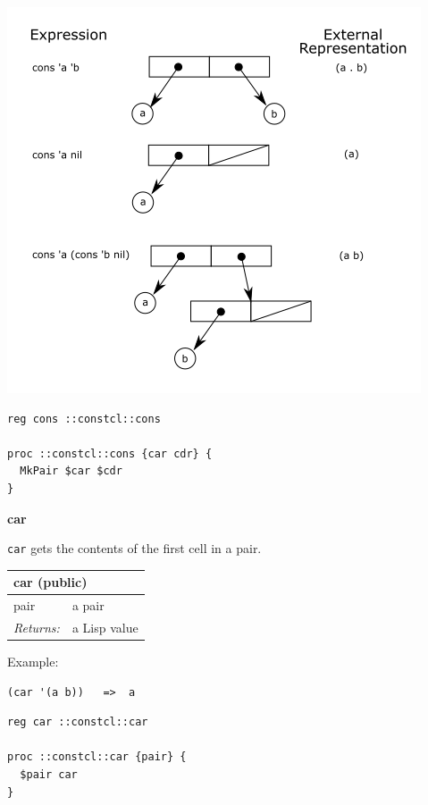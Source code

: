 \documentclass[twoside,9pt]{report}
\begin{document}
\includegraphics{images/consing.png}

\noindent\makebox[\linewidth]{\rule{\linewidth}{0.4pt}}
\begin{lstlisting}
reg cons ::constcl::cons
 
proc ::constcl::cons {car cdr} {
  MkPair $car $cdr
}
\end{lstlisting}
\noindent\makebox[\linewidth]{\rule{\linewidth}{0.4pt}}

\textbf{car}


\texttt{car} gets the contents of the first cell in a pair.

\begin{tabular}{ |l l| }
\hline
\multicolumn{2}{|l|}{car (public)} \\
\hline
pair & a pair \\
\textit{Returns:} & a Lisp value \\
\hline
\end{tabular}


Example:

\noindent\makebox[\linewidth]{\rule{\linewidth}{0.4pt}}
\begin{lstlisting}
(car '(a b))   =>  a
\end{lstlisting}
\noindent\makebox[\linewidth]{\rule{\linewidth}{0.4pt}}
\noindent\makebox[\linewidth]{\rule{\linewidth}{0.4pt}}
\begin{lstlisting}
reg car ::constcl::car
 
proc ::constcl::car {pair} {
  $pair car
}
\end{lstlisting}
\noindent\makebox[\linewidth]{\rule{\linewidth}{0.4pt}}
\end{document}
